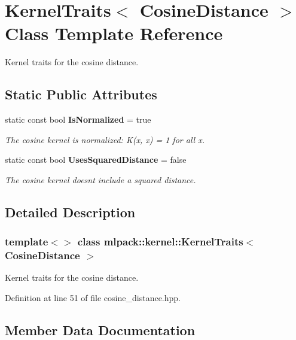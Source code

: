 \section{Kernel\+Traits$<$ Cosine\+Distance $>$ Class Template Reference}
\label{classmlpack_1_1kernel_1_1KernelTraits_3_01CosineDistance_01_4}


Kernel traits for the cosine distance.  


\subsection*{Static Public Attributes}
\begin{DoxyCompactItemize}
\item 
static const bool \textbf{ Is\+Normalized} = true
\begin{DoxyCompactList}\small\item\em The cosine kernel is normalized\+: K(x, x) = 1 for all x. \end{DoxyCompactList}\item 
static const bool \textbf{ Uses\+Squared\+Distance} = false
\begin{DoxyCompactList}\small\item\em The cosine kernel doesn\textquotesingle{}t include a squared distance. \end{DoxyCompactList}\end{DoxyCompactItemize}


\subsection{Detailed Description}
\subsubsection*{template$<$$>$\newline
class mlpack\+::kernel\+::\+Kernel\+Traits$<$ Cosine\+Distance $>$}

Kernel traits for the cosine distance. 

Definition at line 51 of file cosine\+\_\+distance.\+hpp.



\subsection{Member Data Documentation}
\mbox{\label{classmlpack_1_1kernel_1_1KernelTraits_3_01CosineDistance_01_4_a213c74e1e7c01890b64c8b9e88f8c0dc}} 
